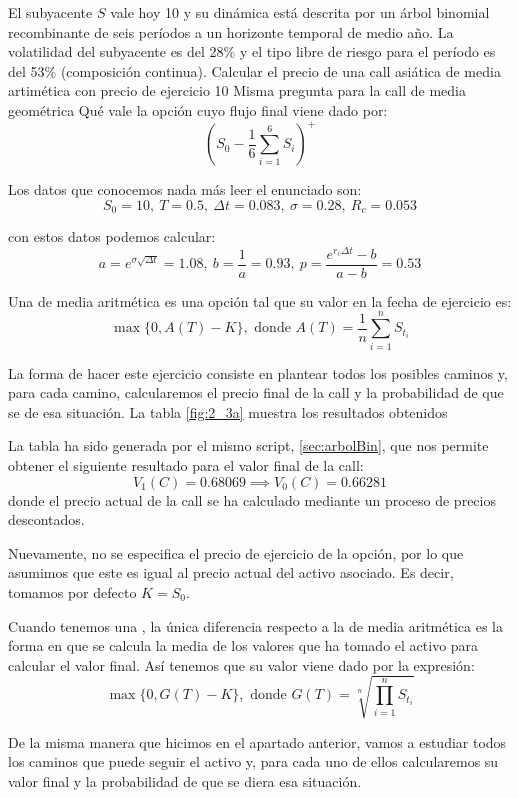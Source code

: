 \begin{problem}[3]
El subyacente $S$ vale hoy 10 y su dinámica está descrita por un árbol binomial recombinante de seis períodos a un horizonte temporal de medio año. La volatilidad del subyacente es del 28\% y el tipo libre de riesgo para el período es del 53\% (composición continua).
\ppart Calcular el precio de una call asiática de media artimética con precio de ejercicio 10
\ppart Misma pregunta para la call de media geométrica
\ppart Qué vale la opción cuyo flujo final viene dado por:
\[\left(S_0-\frac{1}{6}\sum_{i=1}^6S_i\right)^+\]
\solution



Los datos que conocemos nada más leer el enunciado son:
\[S_0=10, \ T=0.5, \ Δt = 0.083, \ σ=0.28, \ R_c=0.053\]

con estos datos podemos calcular:
\[a=e^{σ\sqrt{Δt}} = 1.08, \ b = \frac{1}{a} = 0.93, \ p = \frac{e^{r_cΔt}-b}{a-b}=0.53\]

\spart

Una  de media aritmética es una opción tal que su valor en la fecha de ejercicio es:
\[\max\{0, A(T)-K\}, \text{ donde } A(T) = \frac{1}{n} \sum_{i=1}^nS_{t_i}\]

La forma de hacer este ejercicio consiste en plantear todos los posibles caminos y, para cada camino, calcularemos el precio final de la call y la probabilidad de que se de esa situación. La tabla \ref{fig:2_3a} muestra los resultados obtenidos

La tabla ha sido generada por el mismo script, \ref{sec:arbolBin}, que nos permite obtener el siguiente resultado para el valor final de la call:
\[V_1(C) = 0.68069 \implies V_0(C) = 0.66281\]
donde el precio actual de la call se ha calculado mediante un proceso de precios descontados.

\obs Nuevamente, no se especifica el precio de ejercicio de la opción, por lo que asumimos que este es igual al precio actual del activo asociado. Es decir, tomamos por defecto $K=S_0$.

\spart

Cuando tenemos una , la única diferencia respecto a la de media aritmética es la forma en que se calcula la media de los valores que ha tomado el activo para calcular el valor final. Así tenemos que su valor viene dado por la expresión:
\[\max\{0, G(T)-K\}, \text{ donde } G(T) = \sqrt[n]{\prod_{i=1}^nS_{t_i}}\]

De la misma manera que hicimos en el apartado anterior, vamos a estudiar todos los caminos que puede seguir el activo y, para cada uno de ellos calcularemos su valor final y la probabilidad de que se diera esa situación.


\end{problem}
